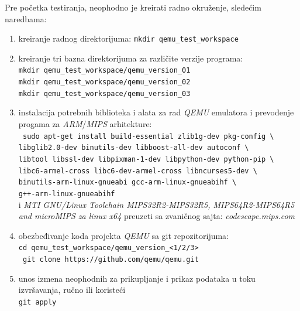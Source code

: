 \documentclass[12pt,oneside]{memoir}
\newcommand{\kod}[1]{\texttt{#1}}
\newcommand{\strano}[1]{\textit{#1}}
\begin{document}
Pre početka testiranja, neophodno je kreirati radno okruženje, sledećim naredbama:
\begin{enumerate}
\item kreiranje radnog direktorijuma: \kod{mkdir qemu\_test\_workspace}
\item kreiranje tri bazna direktorijuma za različite verzije programa: \\
\kod{mkdir qemu\_test\_workspace/qemu\_version\_01} \\ \kod{mkdir qemu\_test\_workspace/qemu\_version\_02} \\ \kod{mkdir qemu\_test\_workspace/qemu\_version\_03} 
\item instalacija potrebnih biblioteka i alata za rad \strano{QEMU} emulatora i prevođenje progama za \strano{ARM}/\strano{MIPS} arhitekture: \\
\kod{ sudo apt-get install build-essential zlib1g-dev pkg-config \textbackslash } \\
\hspace*{6mm} \kod{libglib2.0-dev binutils-dev libboost-all-dev autoconf \textbackslash } \\
\hspace*{6mm} \kod{libtool libssl-dev libpixman-1-dev libpython-dev python-pip \textbackslash } \\
\hspace*{6mm} \kod{libc6-armel-cross libc6-dev-armel-cross libncurses5-dev \textbackslash } \\
\hspace*{6mm} \kod{binutils-arm-linux-gnueabi gcc-arm-linux-gnueabihf \textbackslash } \\
\hspace*{6mm} \kod{g++-arm-linux-gnueabihf} \\
i \strano{MTI GNU/Linux Toolchain MIPS32R2-MIPS32R5, MIPS64R2-MIPS64R5 and microMIPS za linux x64} preuzeti sa zvaničnog sajta: \strano{codescape.mips.com}
\item obezbeđivanje koda projekta \strano{QEMU} sa git repozitorijuma: \\
\kod{cd qemu\_test\_workspace/qemu\_version\_<1/2/3>} \\
\kod{ git clone https://github.com/qemu/qemu.git}
\item unos izmena neophodnih za prikupljanje i prikaz podataka u toku izvršavanja, ručno ili koristeći \\
\kod{git apply}


\end{enumerate}
\end{document}
